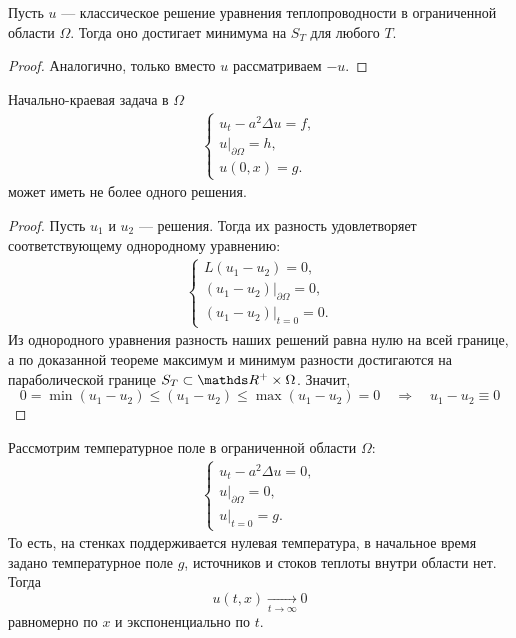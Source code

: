 \begin{corollary}
Пусть $u$ --- классическое решение уравнения теплопроводности в ограниченной области $\Omega$. Тогда оно достигает минимума на $S_T$ для любого $T$.
\end{corollary}
\begin{proof}
Аналогично, только вместо $u$ рассматриваем $-u$.

\end{proof}

\begin{corollary}[Единственность]
Начально-краевая задача в $\Omega$
\begin{gather*}
	\begin{cases*}
		u_t - a^2 \Delta u = f, \\
		u \Big\rvert_{\partial \Omega} = h, \\
		u(0, x) = g.
	\end{cases*}
\end{gather*}
может иметь не более одного решения.
\end{corollary}
\begin {proof}
Пусть $u_1$ и $u_2$ --- решения. Тогда их разность удовлетворяет соответствующему однородному уравнению:
\begin{gather*}
	\begin{cases*}
		L(u_1 - u_2) = 0, \\
		(u_1 - u_2) \Big\rvert_{\partial \Omega} = 0, \\
		(u_1 - u_2) \Big\rvert_{t = 0} = 0.
	\end{cases*}
\end{gather*}
Из однородного уравнения разность наших решений равна нулю на всей границе, а по доказанной теореме максимум и минимум разности достигаются на параболической границе $S_T \subset \real^+ \times \Omega$. Значит,
$$0 = \min (u_1 - u_2) \leq (u_1 - u_2) \leq \max (u_1 - u_2) = 0 \quad \Rightarrow \quad u_1 - u_2 \equiv 0$$

\end{proof}
\begin{corollary} Рассмотрим температурное поле в ограниченной области $\Omega$:
\begin{gather*}
	\begin{cases*}
		u_t - a^2 \Delta u = 0, \\
		u \Big\rvert_{\partial \Omega} = 0, \\
		u \Big\rvert_{t = 0} = g.
	\end{cases*}
\end{gather*}
То есть, на стенках поддерживается нулевая температура, в начальное время задано температурное поле $g$, источников и стоков теплоты внутри области нет. Тогда
$$ u(t,x) \xrightarrow[t \to \infty]{} 0$$
равномерно по $x$ и экспоненциально по $t$.
\end{corollary}
